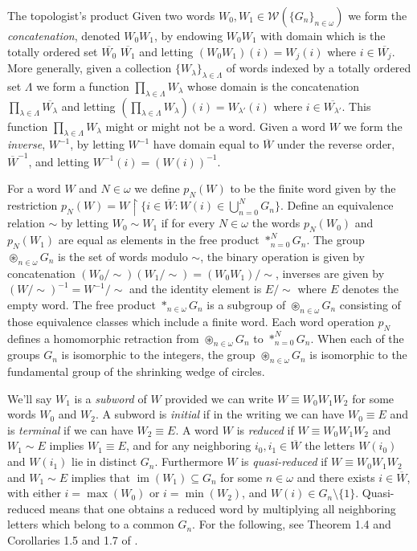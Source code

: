 \documentclass{amsart}
\theoremstyle{definition}\newtheorem{theorem}{Theorem}
\theoremstyle{definition}\newtheorem*{A}{Main Theorem}
\theoremstyle{definition}\newtheorem*{B}{Theorem \ref{elementaryequiv}}
\theoremstyle{definition}\newtheorem*{C}{Theorem \ref{continuous}}
\theoremstyle{definition}\newtheorem*{D}{Theorem \ref{bigisomorphism2}}
\theoremstyle{definition}\newtheorem{bigtheorem}{Main Theorem}
\numberwithin{theorem}{section}
\theoremstyle{definition}\newtheorem{corollary}[theorem]{Corollary}
\theoremstyle{definition}\newtheorem{proposition}[theorem]{Proposition}
\theoremstyle{definition}\newtheorem{definition}[theorem]{Definition}
\theoremstyle{definition}\newtheorem{question}[theorem]{Question}
\theoremstyle{definition}\newtheorem{example}[theorem]{Example}
\theoremstyle{definition}\newtheorem{remark}[theorem]{Remark}
\theoremstyle{definition}\newtheorem{note}[theorem]{Note}
\theoremstyle{definition}\newtheorem{lemma}[theorem]{Lemma}
\theoremstyle{definition}\newtheorem{fact}[theorem]{Fact}
\theoremstyle{definition}\newtheorem{define}[theorem]{Definition}
\theoremstyle{definition}\newtheorem{claim}[theorem]{Claim}
\theoremstyle{definition}\newtheorem{obs}[theorem]{Observation}
\theoremstyle{definition}\newtheorem{definitions}[theorem]{Definitions}
\newcommand{\im}{\operatorname{im}}
\newcommand{\W}{\mathcal{W}}
\DeclareMathOperator{\topprod}{\circledast}
\begin{document}
\begin{section}{The topologist's product}
Given two words $W_0, W_1 \in \W(\{G_n\}_{n \in \omega})$ we form the \emph{concatenation}, denoted $W_0W_1$, by endowing $W_0W_1$ with domain which is the totally ordered set $\overline{W_0}$ $\overline{W_1}$ and letting $(W_0W_1)(i) = W_j(i)$ where $i \in \overline{W_j}$.  More generally, given a collection $\{W_{\lambda}\}_{\lambda \in \Lambda}$ of words indexed by a totally ordered set $\Lambda$ we form a function $\prod_{\lambda \in \Lambda}  W_{\lambda}$ whose domain is the concatenation $\prod_{\lambda \in \Lambda} \overline{W_{\lambda}}$ and letting $(\prod_{\lambda \in \Lambda} W_{\lambda})(i) = W_{\lambda'}(i)$ where $i \in \overline{W_{\lambda'}}$.  This function $\prod_{\lambda \in \Lambda} W_{\lambda}$ might or might not be a word.  Given a word $W$ we form the \emph{inverse}, $W^{-1}$, by letting $W^{-1}$ have domain equal to $\overline{W}$ under the reverse order, $\overline{W}^{-1}$, and letting $W^{-1}(i) = (W(i))^{-1}$.

For a word $W$ and $N \in \omega$ we define $p_N(W)$ to be the finite word given by the restriction $p_N(W) = W \upharpoonright \{i \in \overline{W} : W(i) \in \bigcup_{n = 0}^N G_n\}$.  Define an equivalence relation $\sim$ by letting $W_0 \sim W_1$ if for every $N \in \omega$ the words $p_N(W_0)$ and $p_N(W_1)$ are equal as elements in the free product $*_{n = 0}^N G_n$.  The group $\topprod_{n \in \omega} G_n$ is the set of words modulo $\sim$, the binary operation is given by concatenation $(W_0/\sim)(W_1/\sim) = (W_0W_1)/\sim$, inverses are given by $(W/\sim)^{-1} = W^{-1}/\sim$ and the identity element is $E/\sim$ where $E$ denotes the empty word.  The free product $*_{n \in \omega} G_n$ is a subgroup of $\topprod_{n\in \omega}G_n$ consisting of those equivalence classes which include a finite word.  Each word operation $p_N$ defines a homomorphic retraction from $\topprod_{n \in \omega} G_n$ to $*_{n = 0}^N G_n$.  When each of the groups $G_n$ is isomorphic to the integers, the group $\topprod_{n \in \omega} G_n$ is isomorphic to the fundamental group of the shrinking wedge of circles.

We'll say $W_1$ is a \emph{subword} of $W$ provided we can write $W \equiv W_0W_1W_2$ for some words $W_0$ and $W_2$.  A subword is \emph{initial} if in the writing we can have $W_0 \equiv E$ and is \emph{terminal} if we can have $W_2 \equiv E$.  A word $W$ is \emph{reduced} if $W \equiv W_0W_1W_2$ and $W_1 \sim E$ implies $W_1 \equiv E$, and for any neighboring $i_0, i_1 \in \overline{W}$ the letters $W(i_0)$ and $W(i_1)$ lie in distinct $G_n$.  Furthermore $W$ is \emph{quasi-reduced} if $W \equiv W_0W_1W_2$ and $W_1 \sim E$ implies that $\im(W_1) \subseteq G_n$ for some $n \in \omega$ and there exists $i\in \overline{W}$, with either $i = \max(W_0)$ or $i = \min(W_2)$, and $W(i) \in G_n \setminus \{1\}$.  Quasi-reduced means that one obtains a reduced word by multiplying all neighboring letters which belong to a common $G_n$.  For the following, see Theorem 1.4 and Corollaries 1.5 and 1.7 of \cite{E}.


\end{section}
\end{document}

